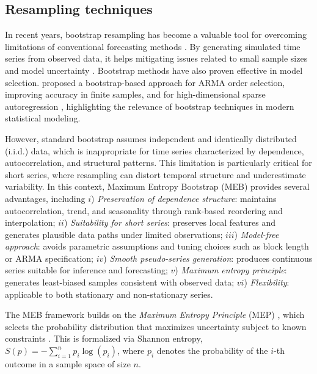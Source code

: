 \documentclass[11pt]{article}
\begin{document}
\subsection{Resampling techniques} \label{Subsec:resampling}

In recent years, bootstrap resampling has become a valuable tool for overcoming limitations of conventional forecasting methods \citep{hasni2019spare}. By generating simulated time series from observed data, it 
helps mitigating issues related to small sample sizes \citep{davison1997bootstrap} and model uncertainty \citep{sarris2020exploiting}.
Bootstrap methods have also proven effective in model selection. \citet{fenga2011bootstrap} proposed a bootstrap-based approach for ARMA order selection, improving accuracy in finite samples, and for high-dimensional sparse autoregression \citep{fenga2017lasso}, highlighting the relevance of bootstrap techniques in modern statistical modeling.

However, standard bootstrap assumes independent and identically distributed (i.i.d.) data, which is inappropriate for time series characterized by dependence, autocorrelation, and structural patterns. This limitation is particularly critical for short series, where resampling can distort temporal structure and underestimate variability. In this context, Maximum Entropy Bootstrap (MEB) provides several advantages, including 
$i$) {\it Preservation of dependence structure}: maintains autocorrelation, trend, and seasonality through rank-based reordering and interpolation;
$ii$)  {\it Suitability for short series}: preserves local features and generates plausible data paths under limited observations; 
$iii$)  {\it Model-free approach}: avoids parametric assumptions and tuning choices such as block length or ARMA specification; 
$iv$)  {\it Smooth pseudo-series generation}: produces continuous series suitable for inference and forecasting; 
$v$)  {\it Maximum entropy principle}: generates least-biased samples consistent with observed data; 
$vi$)  {\it Flexibility}: applicable to both stationary and non-stationary series.

The MEB framework builds on the {\it Maximum Entropy Principle} (MEP) \citep{shannon1948mathematical}, which selects the probability distribution that maximizes uncertainty subject to known constraints \citep{jaynes1957information}. This is formalized via Shannon entropy, $S(p) = -\sum_{i=1}^{n} p_i \log(p_i)$, where $p_i$ denotes the probability of the $i$-th outcome in a sample space of size $n$.
\end{document}
